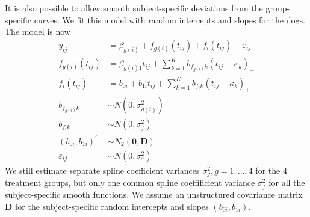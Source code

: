 \documentclass[12pt]{article}
\newcommand{\tr}{^\prime}
\newcommand{\eps}{\varepsilon}
\newcommand{\sigmaeps} {\sigma^2_{\eps}}
\begin{document}
It is also possible to allow smooth subject-specific deviations from the
group-specific curves. We fit this model with random intercepts and slopes
for the dogs. The model is now
\begin{align*}
y_{ij} &= \beta_{g(i)} +  f_{g(i)}(t_{ij}) + f_i(t_{ij}) + \eps_{ij} \\
f_{g(i)}(t_{ij}) &= \beta_{g(i)1} t_{ij} + \sum_{k=1}^K b_{f_{g(i)}k}(t_{ij}- \kappa_k)_+ \\
f_i(t_{ij}) &= b_{0i} + b_{1i} t_{ij} + \sum_{k=1}^K b_{f_i k}(t_{ij}- \kappa_k)_+ \\
b_{f_{g(i)}k} &\sim N(0, \sigma^2_{g(i)}) \\
b_{f_i k} &\sim N(0, \sigma^2_{f}) \\
\left(b_{0i},b_{1i}\right)\tr &\sim N_2(\bm 0, \bm D) \\
\eps_{ij} &\sim N(0, \sigmaeps) 
\end{align*}
We still estimate separate spline coefficient variances 
$\sigma^2_{g},g=1,\dots,4$ 
for the 4 treatment groups, but only one common spline coeffificient
variance $\sigma^2_{f}$ for all the subject-specific smooth functions. We assume
an unstructured covariance matrix $\bm D$ for the subject-specific random
intercepts and slopes $\left(b_{0i},b_{1i}\right)$.
\end{document}
